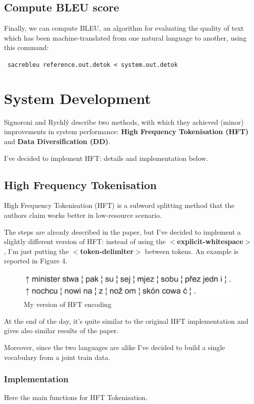 \documentclass[12pt]{article}
\begin{document}
\subsection{Compute BLEU score}
Finally, we can compute BLEU, an algorithm for evaluating the quality of text which has been machine-translated from one natural language to another, using this command:

\vspace{0.2cm}
\texttt{
sacrebleu reference.out.detok < system.out.detok
}

\section{System Development}
Signoroni and Rychlý describe two methods, with which they achieved (minor) improvements in system performance: \textbf{High Frequency Tokenisation (HFT)} and \textbf{Data Diversification (DD)}.

I've decided to implement HFT: details and implementation below.

\subsection{High Frequency Tokenisation}
High Frequency Tokenisation (HFT) is a subword splitting method that the authors claim works better in low-resource scenario. 

The steps are already described in the paper, but I've decided to implement a slightly different version of HFT:
instead of using the \textbf{$<$explicit-whitespace$>$}, I'm just putting the \textbf{$<$token-delimiter$>$} between tokens. 
An example is reported in Figure 4.

\begin{figure}
    \centering
    \includegraphics[width=0.7\linewidth]{./figures/hft_example.png}
    \caption{My version of HFT encoding}
    \label{fig:hft_example}
\end{figure}


At the end of the day, it's quite similar to the original HFT implementation and gives also similar results of the paper. 

Moreover, since the two languages are alike I've decided to build a single vocabulary from a joint train data.

\subsubsection{Implementation}
Here the main functions for HFT Tokenisation.
\end{document}
